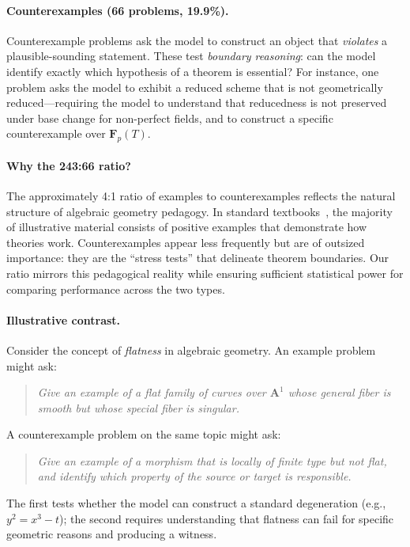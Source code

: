 \paragraph{Counterexamples (66 problems, 19.9\%).}
Counterexample problems ask the model to construct an object that \emph{violates} a plausible-sounding statement.
These test \emph{boundary reasoning}: can the model identify exactly which hypothesis of a theorem is essential?
For instance, one problem asks the model to exhibit a reduced scheme that is not geometrically reduced---requiring the model to understand that reducedness is not preserved under base change for non-perfect fields, and to construct a specific counterexample over $\mathbf{F}_p(T)$.

\paragraph{Why the 243:66 ratio?}
The approximately 4:1 ratio of examples to counterexamples reflects the natural structure of algebraic geometry pedagogy.
In standard textbooks~\citep{hartshorne1977algebraic, vakil2017rising}, the majority of illustrative material consists of positive examples that demonstrate how theories work.
Counterexamples appear less frequently but are of outsized importance: they are the ``stress tests'' that delineate theorem boundaries.
Our ratio mirrors this pedagogical reality while ensuring sufficient statistical power for comparing performance across the two types.

\paragraph{Illustrative contrast.}
Consider the concept of \emph{flatness} in algebraic geometry. An example problem might ask:
\begin{quote}
\emph{Give an example of a flat family of curves over $\mathbf{A}^1$ whose general fiber is smooth but whose special fiber is singular.}
\end{quote}
A counterexample problem on the same topic might ask:
\begin{quote}
\emph{Give an example of a morphism that is locally of finite type but not flat, and identify which property of the source or target is responsible.}
\end{quote}
The first tests whether the model can construct a standard degeneration (e.g., $y^2 = x^3 - t$); the second requires understanding that flatness can fail for specific geometric reasons and producing a witness.

